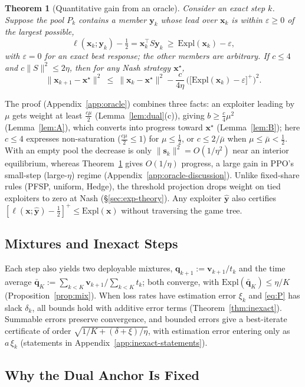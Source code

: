 \documentclass{article} %
\theoremstyle{plain}
\newtheorem{theorem}{Theorem}[section]
\theoremstyle{remark}
\newcommand{\Expl}{\mathrm{Expl}}
\newcommand{\bx}{{\bm{x}}}
\newcommand{\by}{{\bm{y}}}
\newcommand{\bv}{{\bm{v}}}
\newcommand{\bq}{{\bm{q}}}
\newcommand{\xs}{\bx^{\star}}
\newcommand{\dx}{{\bm{s}}}
\begin{document}
\begin{theorem}[Quantitative gain from an oracle]
\label{thm:oracle}
Consider an exact step $k$. Suppose the pool $P_k$ contains a member $\by_k$ whose lead over $\bx_k$ is within $\varepsilon\ge0$ of the largest possible,
\[
\ell(\bx_k;\by_k)-\tfrac12=\bx_k^\top S\by_k\ \ge\ \Expl(\bx_k)-\varepsilon ,
\]
with $\varepsilon=0$ for an exact best response; the other members are arbitrary. If $c\le4$ and $c\|S\|^2\le2\eta$, then for any Nash strategy $\xs$,
\[
\|\bx_{k+1}-\xs\|^2\ \le\ \|\bx_k-\xs\|^2-\frac{c}{4\eta}\,\Big(\big[\Expl(\bx_k)-\varepsilon\big]^+\Big)^2 .
\]
\end{theorem}
The proof (Appendix~\ref{app:oracle}) combines three facts: an exploiter leading by $\mu$ gets weight at least $\tfrac{c\mu}2$ (Lemma~\ref{lem:dual}(c)), giving $b\ge\tfrac c4\mu^2$ (Lemma~\ref{lem:A}), which converts into progress toward $\xs$ (Lemma~\ref{lem:B}); here $c\le4$ expresses non-saturation ($\tfrac{c\mu}2\le1$) for $\mu\le\tfrac12$, or $c\le2/\bar\mu$ when $\mu\le\bar\mu<\tfrac12$. With an empty pool the decrease is only $\|\dx_k\|^2=O(1/\eta^2)$ near an interior equilibrium, whereas Theorem~\ref{thm:oracle} gives $O(1/\eta)$ progress, a large gain in PPO's small-step (large-$\eta$) regime (Appendix~\ref{app:oracle-discussion}). Unlike fixed-share rules (PFSP, uniform, Hedge), the threshold projection drops weight on tied exploiters to zero at Nash (\S\ref{sec:exp-theory}). Any exploiter $\hat\by$ also certifies $[\ell(\bx;\hat\by)-\tfrac12]^+\le\Expl(\bx)$ without traversing the game tree.

\subsection{Mixtures and Inexact Steps}
\label{sec:inexact}

Each step also yields two deployable mixtures, $\bq_{k+1}:=\bv_{k+1}/t_k$ and the time average $\bar\bq_K:=\sum_{k<K}\bv_{k+1}/\sum_{k<K}t_k$; both converge, with $\Expl(\bar\bq_K)\le\eta/K$ (Proposition~\ref{prop:mix}). When loss rates have estimation error $\xi_k$ and \eqref{eq:P} has slack $\delta_k$, all bounds hold with additive error terms (Theorem~\ref{thm:inexact}). Summable errors preserve convergence, and bounded errors give a best-iterate certificate of order $\sqrt{1/K+(\delta+\xi)/\eta}$, with estimation error entering only as $a\,\xi_k$ (statements in Appendix~\ref{app:inexact-statements}).

\subsection{Why the Dual Anchor Is Fixed}
\label{sec:coda}
\end{document}
